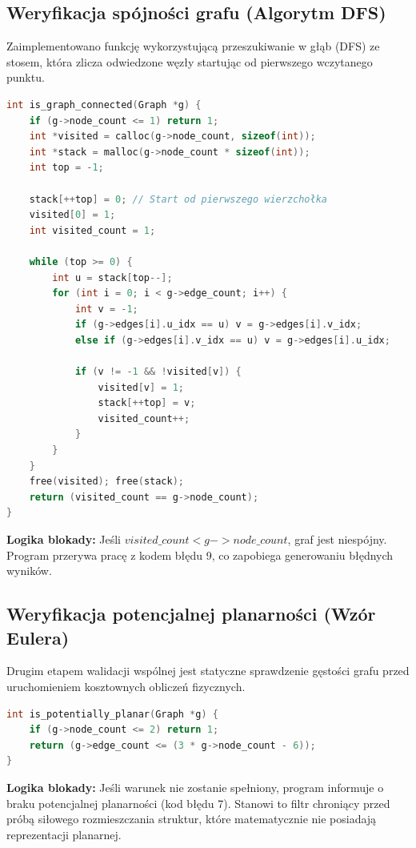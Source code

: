 \documentclass[12pt,a4paper]{article}
\begin{document}
\subsection{Weryfikacja spójności grafu (Algorytm DFS)}
Zaimplementowano funkcję wykorzystującą przeszukiwanie w głąb (DFS) ze stosem, która zlicza odwiedzone węzły startując od pierwszego wczytanego punktu.

\begin{lstlisting}[language=C, caption={Funkcja is\_graph\_connected}]
int is_graph_connected(Graph *g) {
    if (g->node_count <= 1) return 1;
    int *visited = calloc(g->node_count, sizeof(int));
    int *stack = malloc(g->node_count * sizeof(int));
    int top = -1;

    stack[++top] = 0; // Start od pierwszego wierzchołka
    visited[0] = 1;
    int visited_count = 1;

    while (top >= 0) {
        int u = stack[top--];
        for (int i = 0; i < g->edge_count; i++) {
            int v = -1;
            if (g->edges[i].u_idx == u) v = g->edges[i].v_idx;
            else if (g->edges[i].v_idx == u) v = g->edges[i].u_idx;

            if (v != -1 && !visited[v]) {
                visited[v] = 1;
                stack[++top] = v;
                visited_count++;
            }
        }
    }
    free(visited); free(stack);
    return (visited_count == g->node_count);
}
\end{lstlisting}

\textbf{Logika blokady:} Jeśli $visited\_count < g->node\_count$, graf jest niespójny. Program przerywa pracę z kodem błędu 9, co zapobiega generowaniu błędnych wyników.

\subsection{Weryfikacja potencjalnej planarności (Wzór Eulera)}
Drugim etapem walidacji wspólnej jest statyczne sprawdzenie gęstości grafu przed uruchomieniem kosztownych obliczeń fizycznych.

\begin{lstlisting}[language=C, caption={Funkcja is\_potentially\_planar}]
int is_potentially_planar(Graph *g) {
    if (g->node_count <= 2) return 1;
    return (g->edge_count <= (3 * g->node_count - 6));
}
\end{lstlisting}

\textbf{Logika blokady:} Jeśli warunek nie zostanie spełniony, program informuje o braku potencjalnej planarności (kod błędu 7). Stanowi to filtr chroniący przed próbą siłowego rozmieszczania struktur, które matematycznie nie posiadają reprezentacji planarnej.
\newpage
\end{document}
